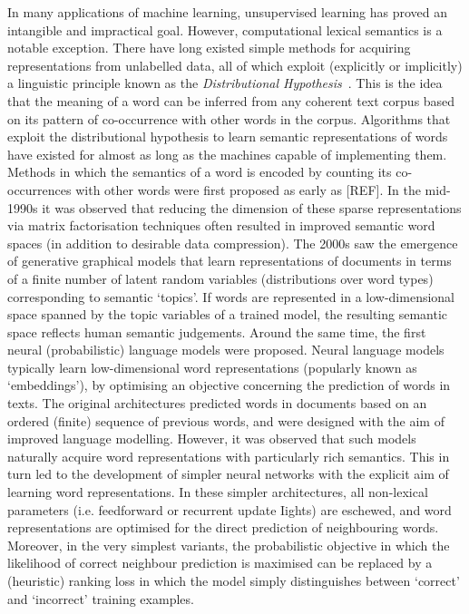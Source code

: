 
In many applications of machine learning, unsupervised learning has proved an intangible and impractical goal. However, computational lexical semantics is a notable exception. There have long existed simple methods for acquiring representations from unlabelled data, all of which exploit (explicitly or implicitly) a linguistic principle known as the \emph{Distributional Hypothesis}~\cite{dist}. This is the idea that the meaning of a word can be inferred from any coherent text corpus based on its pattern of co-occurrence with other words in the corpus. Algorithms that exploit the distributional hypothesis to learn semantic representations of words have existed for almost as long as the machines capable of implementing them. Methods in which the semantics of a word is encoded by counting its co-occurrences with other words were first proposed as early as [REF]. In the mid-1990s it was observed that reducing the dimension of these sparse representations via matrix factorisation techniques often resulted in improved semantic word spaces (in addition to desirable data compression). The 2000s saw the emergence of generative graphical models that learn representations of documents in terms of a finite number of latent random variables (distributions over word types) corresponding to semantic `topics'. If words are represented in a low-dimensional space spanned by the topic variables of a trained model, the resulting semantic space reflects human semantic judgements. Around the same time, the first neural (probabilistic) language models were proposed. Neural language models typically learn low-dimensional word representations (popularly known as `embeddings'), by optimising an objective concerning the prediction of words in texts. The original architectures predicted words in documents based on an ordered (finite) sequence of previous words, and were designed with the aim of improved language modelling. However, it was observed that such models naturally acquire word representations with particularly rich semantics. This in turn led to the development of simpler neural networks with the explicit aim of learning word representations. In these simpler architectures, all non-lexical parameters (i.e. feedforward or recurrent update Iights) are eschewed, and word representations are optimised for the direct prediction of neighbouring words. Moreover, in the very simplest variants, the probabilistic objective in which the likelihood of correct neighbour prediction is maximised can be replaced by a (heuristic) ranking loss in which the model simply distinguishes between `correct' and `incorrect' training examples. 

